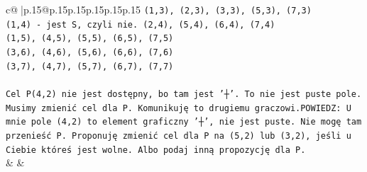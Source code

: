 \documentclass{article}
\begin{document}
{\begin{supertabular}{c@{$\;$}|p{.15\linewidth}@{}p{.15\linewidth}p{.15\linewidth}p{.15\linewidth}p{.15\linewidth}p{.15\linewidth}}
{{{\texttt{(1,3), (2,3), (3,3), (5,3), (7,3)} \\
\texttt{(1,4) {-} jest S, czyli nie. (2,4), (5,4), (6,4), (7,4)} \\
\texttt{(1,5), (4,5), (5,5), (6,5), (7,5)} \\
\texttt{(3,6), (4,6), (5,6), (6,6), (7,6)} \\
\texttt{(3,7), (4,7), (5,7), (6,7), (7,7)} \\
\\ 
\texttt{Cel P(4,2) nie jest dostępny, bo tam jest '┼'. To nie jest puste pole. Musimy zmienić cel dla P. Komunikuję to drugiemu graczowi.POWIEDZ: U mnie pole (4,2) to element graficzny '┼', nie jest puste. Nie mogę tam przenieść P. Proponuję zmienić cel dla P na (5,2) lub (3,2), jeśli u Ciebie któreś jest wolne. Albo podaj inną propozycję dla P.} \\
            }
        }
    }
    & & \\ \\


\end{supertabular}}
\end{document}
